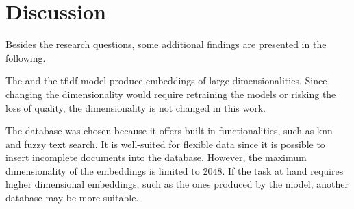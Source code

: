 \section{Discussion}\label{sec:discussion}











Besides the research questions, some additional findings are presented in the following.

The \infersent{} and the \ac{tfidf} model produce embeddings of large dimensionalities.
Since changing the dimensionality would require retraining the models 
or risking the loss of quality, the dimensionality is not changed in this work.

The database \databaseName{} was chosen because it offers built-in functionalities,
such as \ac{knn} and fuzzy text search.
It is well-suited for flexible data since it is possible to insert 
incomplete documents into the database.
However, the maximum dimensionality of the embeddings is limited to 2048.
If the task at hand requires higher dimensional embeddings, such as the ones produced by the \infersent{} model, 
another database may be more suitable.